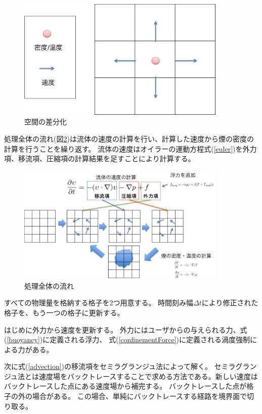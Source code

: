 \begin{figure}
	\begin{center}
		\includegraphics[width=100mm]{grid.png}
		\caption{空間の差分化}
		\label{grid}
	\end{center}
\end{figure}


処理全体の流れ(図\ref{overview})は流体の速度の計算を行い、計算した速度から煙の密度の計算を行うことを繰り返す。
流体の速度はオイラーの運動方程式(\ref{euler})を外力項、移流項、圧縮項の計算結果を足すことにより計算する。

\begin{figure}
	\begin{center}
		\includegraphics[width=100mm]{overview.png}
		\caption{処理全体の流れ}
		\label{overview}
	\end{center}
\end{figure}

すべての物理量を格納する格子を2つ用意する。
時間刻み幅$\Delta t$により修正された格子を、もう一つの格子に更新する。

はじめに外力から速度を更新する。
外力にはユーザからの与えられる力、式(\ref{buoyancy})に定義される浮力、
式(\ref{confinementForce})に定義される渦度強制による力がある。

次に式(\ref{advection})の移流項をセミラグランジュ法によって解く。
セミラグランジュ法とは速度場をバックトレースすることで求める方法である。新しい速度はバックトレースした点にある速度場から補完する。
バックトレースした点が格子の外の場合がある。
この場合、単純にバックトレースする経路を境界面で切り取る。

